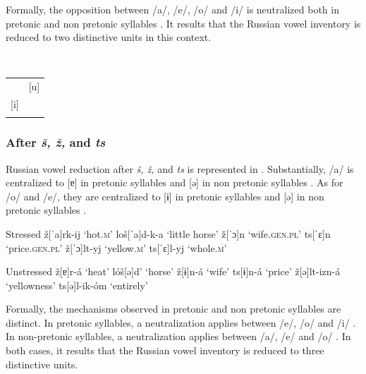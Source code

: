 \documentclass[output=paper,modfonts,newtxmath,hidelinks,]{langscibook}
\begin{document}
\noindent Formally, the opposition between /a/, /e/, /o/ and /i/ is neutralized both in pretonic and non pretonic syllables . It results that the Russian vowel inventory is reduced to two distinctive units in this context.

\label{5:6}\\\medskip
\begin{tabular}{|p{1.7cm}p{1.7cm}|}
\hline
&\multicolumn{1}{|c|}{[u]}\\\cline{2-2}
\multicolumn{1}{|c}{[i]}&\\
&\\\hline
\end{tabular}
\z

\newpage 
\subsubsection{After \textit{š, ž,} and \textit{ts}}\label{5:s2.1.3}

Russian vowel reduction after \textit{š, ž,} and \textit{ts} is represented in . Substantially, /a/ is centralized to [ɐ] in pretonic syllables  and [ə] in non pretonic syllables . As for /o/ and /e/, they are centralized to [ɨ] in pretonic syllables  and [ə] in non pretonic syllables .%

\ea\label{5:7}\begin{multicols}{2}
\begin{xlist}
\exi{} {Stressed}
\ex ž[ˈa]rk-ij \tabto{2.1cm}‘hot.\textsc{m}’\label{5:7a}
\ex loš[ˈa]d-k-a \tabto{2.1cm}‘little horse’\label{5:7b}
\ex ž[ˈɔ]n \tabto{2.1cm}‘wife.\textsc{gen.pl}’\label{5:7c}
\exi{} ts[ˈɛ]n \tabto{2.1cm}‘price.\textsc{gen.pl}’
\ex ž[ˈɔ]lt-yj \tabto{2.1cm}‘yellow.\textsc{m}’\label{5:7d}
\exi{} ts[ˈɛ]l-yj \tabto{2.1cm}‘whole.\textsc{m}’
\end{xlist}\columnbreak
\begin{xlist}
\exi{} {Unstressed}
\exi{} ž[ɐ]r-á \tabto{2.1cm}‘heat’
\exi{} lóš[ə]d’ \tabto{2.1cm}‘horse’
\exi{} ž[ɨ]n-á \tabto{2.1cm}‘wife’
\exi{} ts[ɨ]n-á \tabto{2.1cm}‘price’
\exi{} ž[ə]lt-izn-á \tabto{2.1cm}‘yellowness’
\exi{} ts[ə]l-ik-óm \tabto{2.1cm}‘entirely’
\end{xlist}
\end{multicols}
\z

\noindent Formally, the mechanisms observed in pretonic and non pretonic syllables are distinct. In pretonic syllables, a neutralization applies between /e/, /o/ and /i/ . In non-pretonic syllables, a neutralization applies between /a/, /e/ and /o/ . In both cases, it results that the Russian vowel inventory is reduced to three distinctive units.
\end{document}
